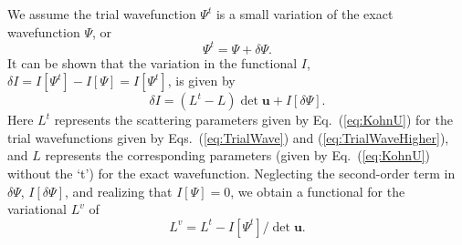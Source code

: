 \documentclass[preprint,showpacs,showkeys,preprintnumbers,amsmath,amssymb,longbibliography,pra,aps]{revtex4-1}
\begin{document}
We assume the trial wavefunction $\Psi^t$ is a small variation of the exact
wavefunction
$\Psi$, or
\begin{equation}
\Psi^t = \Psi + \delta \Psi.
\label{eq:PsiTrialRelation}
\end{equation}
It can be shown that the variation in the functional $I$,
$\delta I = I[\Psi^t] - I[\Psi] = I[\Psi^t]$,
is given by
\begin{equation}
\delta I = (L^t - L) \det \textbf{u} + I[\delta \Psi].
\label{eq:IlPsiVariation}
\end{equation}
Here $L^t$ represents the scattering parameters given by Eq.~(\ref{eq:KohnU})
for the trial wavefunctions given by Eqs.~(\ref{eq:TrialWave}) and
(\ref{eq:TrialWaveHigher}), and $L$ represents the corresponding parameters
(given by Eq.~(\ref{eq:KohnU}) without the `t') for the exact wavefunction.
Neglecting the second-order term in $\delta \Psi$, $I[\delta \Psi]$, and realizing that
$I[\Psi] = 0$, we obtain a functional for the variational $L^v$ of
\begin{equation}
L^v = L^t - I[\Psi^t] / \det \textbf{u}.
\label{eq:ComplexKohnVariation}
\end{equation}
\end{document}
